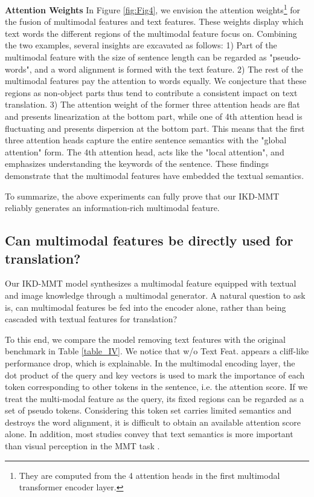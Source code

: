 \documentclass[11pt]{article}
\begin{document}
\textbf{Attention Weights}
In Figure \ref{fig:Fig4}, we envision the attention weights\footnote{They are computed from the 4 attention heads in the first multimodal transformer encoder layer.} for the fusion of multimodal features and text features.
These weights display which text words the different regions of the multimodal feature focus on.
Combining the two examples, several insights are excavated as follows:
1) Part of the multimodal feature with the size of sentence length can be regarded as "pseudo-words", and a word alignment is formed with the text feature.
2) The rest of the multimodal features pay the attention to words equally. We conjecture that these regions as non-object parts thus tend to contribute a consistent impact on text translation.
3) The attention weight of the former three attention heads are flat and presents linearization at the bottom part, while one of 4th attention head is fluctuating and presents dispersion at the bottom part.
This means that the first three attention heads capture the entire sentence semantics with the "global attention" form.
The 4th attention head, acts like the "local attention", and emphasizes understanding the keywords of the sentence.
These findings demonstrate that the multimodal features have embedded the textual semantics.

To summarize, the above experiments can fully prove that our IKD-MMT reliably generates an information-rich multimodal feature.

\subsection{Can multimodal features be directly used for translation?}
Our IKD-MMT model synthesizes a multimodal feature equipped with textual and image knowledge through a multimodal generator.
A natural question to ask is, can multimodal features be fed into the encoder alone, rather than being cascaded with textual features for translation?

To this end, we compare the model removing text features with the original benchmark in Table \ref{table_IV}.
We notice that w/o Text Feat. appears a cliff-like performance drop, which is explainable.
In the multimodal encoding layer, the dot product of the query and key vectors is used to mark the importance of each token corresponding to other tokens in the sentence, i.e. the attention score.
If we treat the multi-modal feature as the query, its fixed  regions can be regarded as a set of pseudo tokens.
Considering this token set carries limited semantics and destroys the word alignment, it is difficult to obtain an available attention score alone.
In addition, most studies convey that text semantics is more important than visual perception in the MMT task \cite{gronroos-etal-2018-memad, lala-etal-2018-sheffield}.
\end{document}
